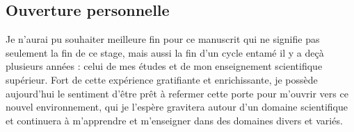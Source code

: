 \subsection{Ouverture personnelle}

Je n'aurai pu souhaiter meilleure fin pour ce manuscrit qui ne signifie pas seulement la fin de ce stage, mais aussi la fin d'un cycle entamé il y a deçà plusieurs années : celui de mes études et de mon enseignement scientifique supérieur. Fort de cette expérience gratifiante et enrichissante, je possède aujourd'hui le sentiment d'être prêt à refermer cette porte pour m'ouvrir vers ce nouvel environnement, qui je l'espère gravitera autour d'un domaine scientifique et continuera à m'apprendre et m'enseigner dans des domaines divers et variés.

